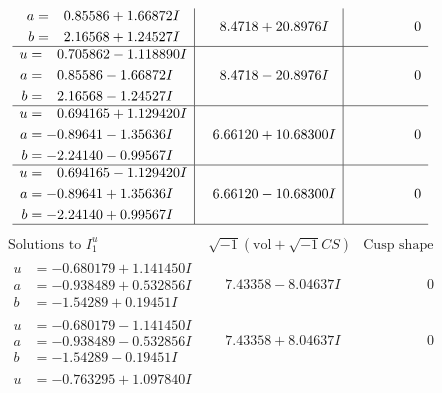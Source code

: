 \documentclass[1p]{elsarticle_modified}
\theoremstyle{definition}
\newcommand{\I}{\sqrt{-1}}
\begin{document}
$$\begin{array}{c|c|c}
\begin{aligned}
a &= \phantom{-}0.85586 + 1.66872 I \\
b &= \phantom{-}2.16568 + 1.24527 I\end{aligned}
 & \phantom{-}8.4718 + 20.8976 I & \phantom{-0.000000 } 0 \\ \hline\begin{aligned}
u &= \phantom{-}0.705862 - 1.118890 I \\
a &= \phantom{-}0.85586 - 1.66872 I \\
b &= \phantom{-}2.16568 - 1.24527 I\end{aligned}
 & \phantom{-}8.4718 - 20.8976 I & \phantom{-0.000000 } 0 \\ \hline\begin{aligned}
u &= \phantom{-}0.694165 + 1.129420 I \\
a &= -0.89641 - 1.35636 I \\
b &= -2.24140 - 0.99567 I\end{aligned}
 & \phantom{-}6.66120 + 10.68300 I & \phantom{-0.000000 } 0 \\ \hline\begin{aligned}
u &= \phantom{-}0.694165 - 1.129420 I \\
a &= -0.89641 + 1.35636 I \\
b &= -2.24140 + 0.99567 I\end{aligned}
 & \phantom{-}6.66120 - 10.68300 I & \phantom{-0.000000 } 0\\
 \hline 
 \end{array}$$\newpage$$\begin{array}{c|c|c}  
\text{Solutions to }I^u_{1}& \I (\text{vol} + \sqrt{-1}CS) & \text{Cusp shape}\\
 \hline 
\begin{aligned}
u &= -0.680179 + 1.141450 I \\
a &= -0.938489 + 0.532856 I \\
b &= -1.54289 + 0.19451 I\end{aligned}
 & \phantom{-}7.43358 - 8.04637 I & \phantom{-0.000000 } 0 \\ \hline\begin{aligned}
u &= -0.680179 - 1.141450 I \\
a &= -0.938489 - 0.532856 I \\
b &= -1.54289 - 0.19451 I\end{aligned}
 & \phantom{-}7.43358 + 8.04637 I & \phantom{-0.000000 } 0 \\ \hline\begin{aligned}
u &= -0.763295 + 1.097840 I \\

\end{aligned}
\end{array}$$
\end{document}
